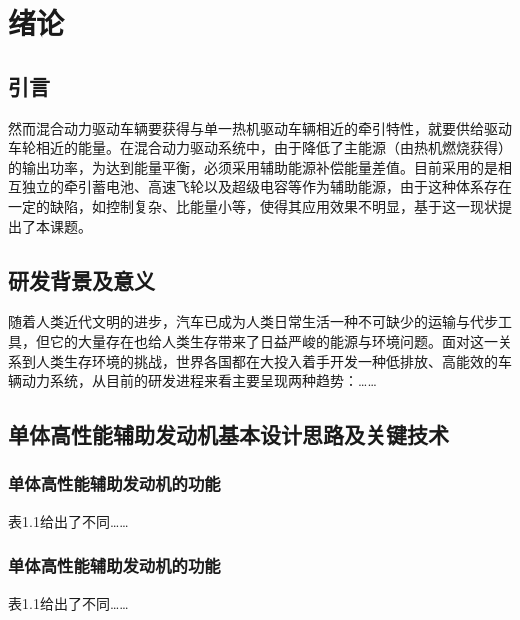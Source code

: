 \chapter{绪\quad 论}

\section{引言}
然而混合动力驱动车辆要获得与单一热机驱动车辆相近的牵引特性，就要供给驱动车轮相近的能量。在混合动力驱动系统中，由于降低了主能源（由热机燃烧获得）的输出功率，为达到能量平衡，必须采用辅助能源补偿能量差值。目前采用的是相互独立的牵引蓄电池、高速飞轮以及超级电容等作为辅助能源，由于这种体系存在一定的缺陷，如控制复杂、比能量小等，使得其应用效果不明显，基于这一现状提出了本课题。
\section{研发背景及意义}
随着人类近代文明的进步，汽车已成为人类日常生活一种不可缺少的运输与代步工具，但它的大量存在也给人类生存带来了日益严峻的能源与环境问题。面对这一关系到人类生存环境的挑战，世界各国都在大投入着手开发一种低排放、高能效的车辆动力系统，从目前的研发进程来看主要呈现两种趋势：…… 
\section{单体高性能辅助发动机基本设计思路及关键技术}
\subsection{单体高性能辅助发动机的功能}
表1.1给出了不同……
\subsection{单体高性能辅助发动机的功能}
表1.1给出了不同……
